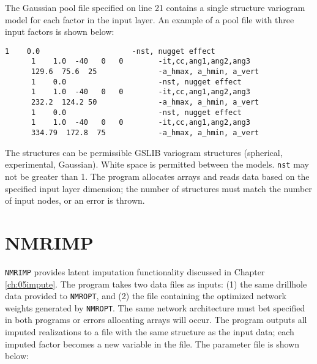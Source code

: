 The Gaussian pool file specified on line 21 contains a single structure variogram model for each factor in the input layer. An example of a pool file with three input factors is shown below:

\begin{framed}
   \begin{lstlisting}[style=ccgParameterfile]
      1    0.0                     -nst, nugget effect
      1    1.0  -40   0   0        -it,cc,ang1,ang2,ang3
      129.6  75.6  25              -a_hmax, a_hmin, a_vert  
      1    0.0                     -nst, nugget effect
      1    1.0  -40   0   0        -it,cc,ang1,ang2,ang3
      232.2  124.2 50              -a_hmax, a_hmin, a_vert
      1    0.0                     -nst, nugget effect
      1    1.0  -40   0   0        -it,cc,ang1,ang2,ang3
      334.79  172.8  75            -a_hmax, a_hmin, a_vert  
   \end{lstlisting}
\end{framed}

The structures can be permissible GSLIB variogram structures (spherical, experimental, Gaussian). White space is permitted between the models. \texttt{nst} may not be greater than 1. The program allocates arrays and reads data based on the specified input layer dimension; the number of structures must match the number of input nodes, or an error is thrown.

\FloatBarrier
\section{NMRIMP}
\label{sect:Anmrimp}

\texttt{NMRIMP} provides latent imputation functionality discussed in Chapter \ref{ch:05impute}. The program takes two data files as inputs: (1) the same drillhole data provided to \texttt{NMROPT}, and (2) the file containing the optimized network weights generated by \texttt{NMROPT}. The same network architecture must bet specified in both programs or errors allocating arrays will occur. The program outputs all imputed realizations to a file with the same structure as the input data; each imputed factor becomes a new variable in the file. The parameter file is shown below:

